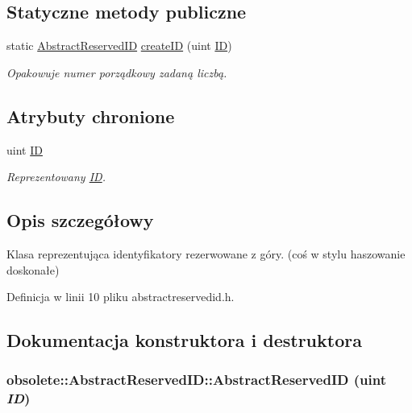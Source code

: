 \subsection*{Statyczne metody publiczne}
\begin{DoxyCompactItemize}
\item 
static \hyperlink{classobsolete_1_1AbstractReservedID}{AbstractReservedID} \hyperlink{classobsolete_1_1AbstractReservedID_a38fa00bf6097ab9cff285c8480c8097e}{createID} (uint \hyperlink{classobsolete_1_1ID}{ID})
\begin{DoxyCompactList}\small\item\em Opakowuje numer porządkowy zadaną liczbą. \item\end{DoxyCompactList}\end{DoxyCompactItemize}
\subsection*{Atrybuty chronione}
\begin{DoxyCompactItemize}
\item 
uint \hyperlink{classobsolete_1_1AbstractID_a5f67fa1c7d96085f0ef41193b60b570c}{ID}
\begin{DoxyCompactList}\small\item\em Reprezentowany \hyperlink{classobsolete_1_1ID}{ID}. \item\end{DoxyCompactList}\end{DoxyCompactItemize}


\subsection{Opis szczegółowy}
Klasa reprezentująca identyfikatory rezerwowane z góry. (coś w stylu haszowanie doskonałe) 

Definicja w linii 10 pliku abstractreservedid.h.



\subsection{Dokumentacja konstruktora i destruktora}
\hypertarget{classobsolete_1_1AbstractReservedID_ad24b4475da6154fdc7d5d146a8fb311f}{
\subsubsection[{AbstractReservedID}]{\setlength{\rightskip}{0pt plus 5cm}obsolete::AbstractReservedID::AbstractReservedID (uint {\em ID})}}
\label{classobsolete_1_1AbstractReservedID_ad24b4475da6154fdc7d5d146a8fb311f}


